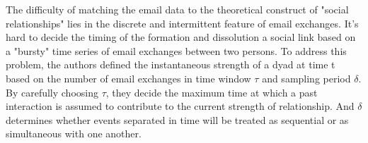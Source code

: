 \documentclass[11pt]{article}
\begin{document}
The difficulty of matching the email data to the theoretical construct
of "social relationships" lies in the discrete and intermittent feature
of email exchanges. It's hard to decide the timing of the formation and
dissolution a social link based on a "bursty" time series of email
exchanges between two persons. To address this problem, the authors
defined the instantaneous strength of a dyad at time t based on the
number of email exchanges in time window \(\tau\) and sampling period
\(\delta\). By carefully choosing \(\tau\), they decide the maximum time
at which a past interaction is assumed to contribute to the current
strength of relationship. And \(\delta\) determines whether events
separated in time will be treated as sequential or as simultaneous with
one another.


    
    
    
    
\end{document}
